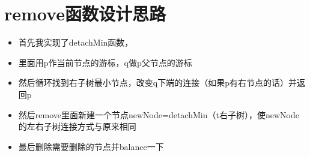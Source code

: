 \documentclass[UTF8]{ctexart}
\begin{document}
\pagestyle{fancy}
\fancyhead{}

\section{remove函数设计思路}

\begin{itemize}
\item 首先我实现了detachMin函数，
\item 里面用p作当前节点的游标，q做p父节点的游标
\item 然后循环找到右子树最小节点，改变q下端的连接（如果p有右节点的话）并返回p
\item 然后remove里面新建一个节点newNode=detachMin（t右子树），使newNode的左右子树连接方式与原来相同
\item 最后删除需要删除的节点并balance一下

\end{itemize}

\end{document}
